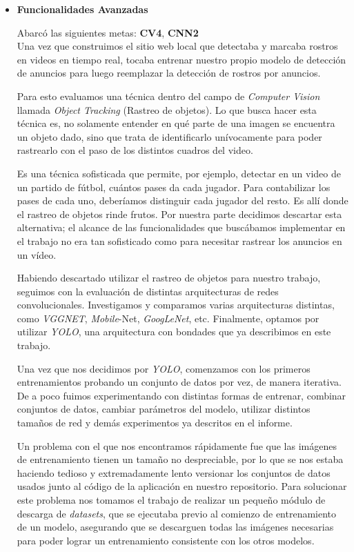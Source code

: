 \documentclass[a4paper]{article}
\begin{document}
\begin{itemize}
\item \textbf{Funcionalidades Avanzadas}

Abarcó las siguientes metas: \textbf{CV4}, \textbf{CNN2} \\

Una vez que construimos el sitio web local que detectaba y marcaba rostros en videos en tiempo real, tocaba entrenar nuestro propio modelo de detección de anuncios para luego reemplazar la detección de rostros por anuncios.

Para esto evaluamos una técnica dentro del campo de \textit{Computer Vision} llamada \textit{Object Tracking} (Rastreo de objetos). Lo que busca hacer esta técnica es, no solamente entender en qué parte de una imagen se encuentra un objeto dado, sino que trata de identificarlo unívocamente para poder rastrearlo con el paso de los distintos cuadros del video.

Es una técnica sofisticada que permite, por ejemplo, detectar en un video de un partido de fútbol, cuántos pases da cada jugador. Para contabilizar los pases de cada uno, deberíamos distinguir cada jugador del resto. Es allí donde el rastreo de objetos rinde frutos.
Por nuestra parte decidimos descartar esta alternativa; el alcance de las funcionalidades que buscábamos implementar en el trabajo no era tan sofisticado como para necesitar rastrear los anuncios en un vídeo.

Habiendo descartado utilizar el rastreo de objetos para nuestro trabajo, seguimos con la evaluación de distintas arquitecturas de redes convolucionales. Investigamos y comparamos varias arquitecturas distintas, como \textit{VGGNET}, \textit{Mobile}-Net, \textit{GoogLeNet}, etc. Finalmente, optamos por utilizar \textit{YOLO}, una arquitectura con bondades que ya describimos en este trabajo.

Una vez que nos decidimos por \textit{YOLO}, comenzamos con los primeros entrenamientos probando un conjunto de datos por vez, de manera iterativa. De a poco fuimos experimentando con distintas formas de entrenar, combinar conjuntos de datos, cambiar parámetros del modelo, utilizar distintos tamaños de red y demás experimentos ya descritos en el informe.

Un problema con el que nos encontramos rápidamente fue que las imágenes de entrenamiento tienen un tamaño no despreciable, por lo que se nos estaba haciendo tedioso y extremadamente lento versionar los conjuntos de datos usados junto al código de la aplicación en nuestro repositorio. Para solucionar este problema nos tomamos el trabajo de realizar un pequeño módulo de descarga de \textit{datasets}, que se ejecutaba previo al comienzo de entrenamiento de un modelo, asegurando que se descarguen todas las imágenes necesarias para poder lograr un entrenamiento consistente con los otros modelos.


\end{itemize}
\end{document}
